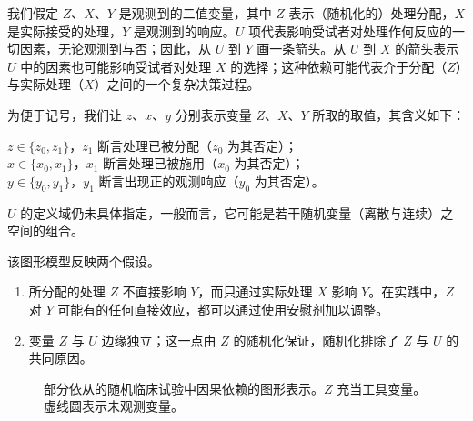 我们假定 $Z$、$X$、$Y$ 是观测到的二值变量，其中 $Z$ 表示（随机化的）处理分配，$X$ 是实际接受的处理，$Y$ 是观测到的响应。$U$ 项代表影响受试者对处理作何反应的一切因素，无论观测到与否；因此，从 $U$ 到 $Y$ 画一条箭头。从 $U$ 到 $X$ 的箭头表示 $U$ 中的因素也可能影响受试者对处理 $X$ 的选择；这种依赖可能代表介于分配（$Z$）与实际处理（$X$）之间的一个复杂决策过程。

为便于记号，我们让 $z$、$x$、$y$ 分别表示变量 $Z$、$X$、$Y$ 所取的取值，其含义如下：
\begin{flushleft}
\hspace{1.5em}$z\in\{z_0,z_1\}$，$z_1$ 断言处理已被分配（$z_0$ 为其否定）；\\
\hspace{1.5em}$x\in\{x_0,x_1\}$，$x_1$ 断言处理已被施用（$x_0$ 为其否定）；\\
\hspace{1.5em}$y\in\{y_0,y_1\}$，$y_1$ 断言出现正的观测响应（$y_0$ 为其否定）。
\end{flushleft}

$U$ 的定义域仍未具体指定，一般而言，它可能是若干随机变量（离散与连续）之空间的组合。

该图形模型反映两个假设。

\begin{enumerate}[label=\arabic*.,leftmargin=2.0em]
\item 所分配的处理 $Z$ 不直接影响 $Y$，而只通过实际处理 $X$ 影响 $Y$。在实践中，$Z$ 对 $Y$ 可能有的任何直接效应，都可以通过使用安慰剂加以调整。
\item 变量 $Z$ 与 $U$ 边缘独立；这一点由 $Z$ 的随机化保证，随机化排除了 $Z$ 与 $U$ 的共同原因。
\end{enumerate}

\begin{figure}[htbp]
\centering
{}
\caption{部分依从的随机临床试验中因果依赖的图形表示。$Z$ 充当工具变量。虚线圆表示未观测变量。}
\label{fig:8.1}
\end{figure}

